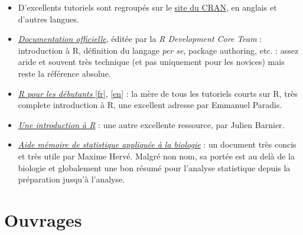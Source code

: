 \documentclass[
  letterpaper,
  DIV=11,
  numbers=noendperiod]{scrreprt}
\providecommand{\tightlist}{%
  \setlength{\itemsep}{0pt}\setlength{\parskip}{0pt}}\usepackage{longtable,booktabs,array}
\begin{document}
\begin{itemize}
\tightlist
\item
  D'excellents tutoriels sont regroupés sur le
  \href{http://cran.r-project.org/other-docs.html}{site du CRAN}, en
  anglais et d'autres langues.
\item
  \href{http://cran.r-project.org/manuals.html}{\emph{Documentation
  officielle}}, éditée par la \emph{R Development Core Team} :
  introduction à R, définition du langage \emph{per se}, package
  authoring, etc. : assez aride et souvent très technique (et pas
  uniquement pour les novices) mais reste la référence absolue.
\item
  \href{http://cran.r-project.org/doc/contrib/Paradis-rdebuts_fr.pdf}{\emph{R
  pour les débutants} {[}fr{]}},
  \href{http://cran.r-project.org/doc/contrib/Paradis-rdebuts_en.pdf}{{[}en{]}}
  : la mère de tous les tutoriels courts sur R, très complete
  introduction à R, une excellent adresse par Emmanuel Paradis.
\item
  \href{http://cran.r-project.org/doc/contrib/Barnier-intro_R.pdf}{\emph{Une
  introduction à R}} : une autre excellente ressource, par Julien
  Barnier.
\item
  \href{http://cran.r-project.org/doc/contrib/Herve-Aide-memoire-statistique.pdf}{\emph{Aide
  mémoire de statistique appliquée à la biologie}} : un document très
  concis et très utile par Maxime Hervé. Malgré non nom, sa portée est
  au delà de la biologie et globalement une bon résumé pour l'analyse
  statistique depuis la préparation jusqu'à l'analyse.
\end{itemize}

\hypertarget{ouvrages}{%
\section{Ouvrages}\label{ouvrages}}
\end{document}
